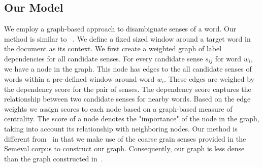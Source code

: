 \documentclass[12pt,letterpaper]{article}
\newcommand{\blue}[1]{\textcolor{RoyalBlue}{#1}}
\newcommand{\instructions}[1]{\blue{\textit{#1}}}
\begin{document}
\subsection{Our Model}
\label{sec:proposed-models}
We employ a graph-based approach to disambiguate senses of a word. Our method is similar to ~\cite{Sinha}. We define a fixed sized window around a target word in the document as its context. We first create a weighted graph of label dependencies for all candidate senses. For every candidate sense $s_{ij}$ for word $w_i$, we have a node in the graph. This node has edges to the all candidate senses of words within a pre-defined window around word $w_i$. These edges are weighed by the dependency score for the pair of senses. The dependency score captures the relationship between two candidate senses for nearby words. Based on the edge weights we assign scores to each node based on a graph-based measure of centrality. The score of a node denotes the "importance" of the node in the graph, taking into account its relationship with neighboring nodes.
Our method is different from~\cite{Sinha} in that we make use of the coarse grain senses provided in the Semeval corpus to construct our graph. Consequently, our graph is less dense than the graph constructed in~\cite{Sinha}.
\end{document}
